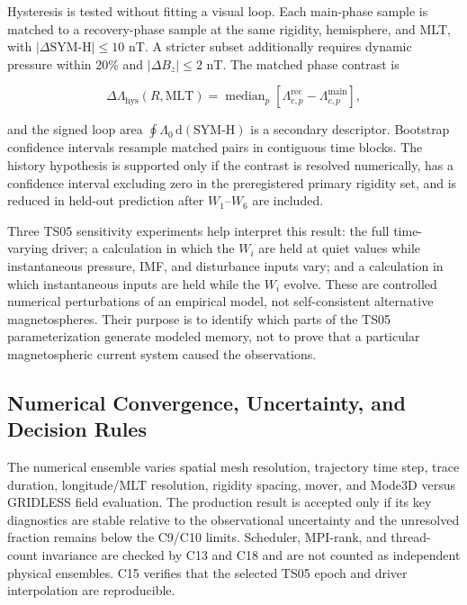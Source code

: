 Hysteresis is tested without fitting a visual loop. Each main-phase sample is
matched to a recovery-phase sample at the same rigidity, hemisphere, and MLT,
with $|\Delta\mathrm{SYM\mbox{-}H}|\leq10$ nT. A stricter subset additionally
requires dynamic pressure within 20\% and $|\Delta B_z|\leq2$ nT. The matched
phase contrast is
\begin{linenomath*}
\begin{equation}
 \Delta\Lambda_{\mathrm{hys}}(R,\mathrm{MLT})=
 \operatorname{median}_{p}
 \left[\Lambda_{c,p}^{\mathrm{rec}}-
       \Lambda_{c,p}^{\mathrm{main}}\right],
 \label{eq:exp-hysteresis}
\end{equation}
\end{linenomath*}
and the signed loop area $\oint\Lambda_0\,\mathrm{d}(\mathrm{SYM\mbox{-}H})$
is a secondary descriptor. Bootstrap confidence intervals resample matched
pairs in contiguous time blocks. The history hypothesis is supported only if
the contrast is resolved numerically, has a confidence interval excluding
zero in the preregistered primary rigidity set, and is reduced in held-out
prediction after $W_1$--$W_6$ are included.

Three TS05 sensitivity experiments help interpret this result: the full
time-varying driver; a calculation in which the $W_i$ are held at quiet values
while instantaneous pressure, IMF, and disturbance inputs vary; and a
calculation in which instantaneous inputs are held while the $W_i$ evolve.
These are controlled numerical perturbations of an empirical model, not
self-consistent alternative magnetospheres. Their purpose is to identify which
parts of the TS05 parameterization generate modeled memory, not to prove that a
particular magnetospheric current system caused the observations.

\subsection{Numerical Convergence, Uncertainty, and Decision Rules}

The numerical ensemble varies spatial mesh resolution, trajectory time step,
trace duration, longitude/MLT resolution, rigidity spacing, mover, and
Mode3D versus GRIDLESS field evaluation. The production result is accepted
only if its key diagnostics are stable relative to the observational
uncertainty and the unresolved fraction remains below the C9/C10 limits.
Scheduler, MPI-rank, and thread-count invariance are checked by C13 and C18 and
are not counted as independent physical ensembles. C15 verifies that the
selected TS05 epoch and driver interpolation are reproducible.

